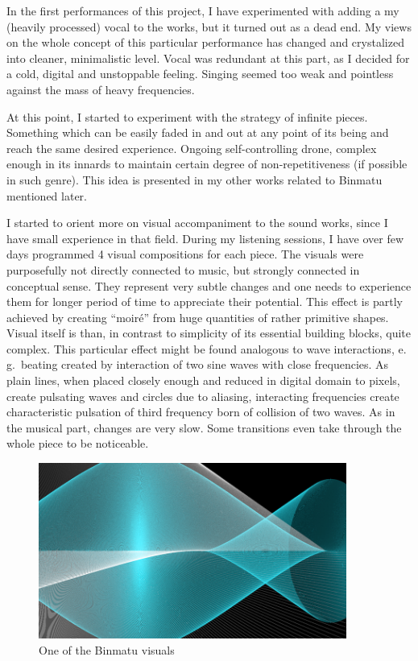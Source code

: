 \documentclass[12pt,a4paper,oneside]{report}
\begin{document}
In the first performances of this project, I have experimented with adding a my (heavily processed) vocal to the works, but it turned out as a dead end. My views on the whole concept of this particular performance has changed and crystalized into cleaner, minimalistic level. Vocal was redundant at this part, as I decided for a cold, digital and unstoppable feeling. Singing seemed too weak and pointless against the mass of heavy frequencies. 

At this point, I started to experiment with the strategy of infinite pieces. Something which can be easily faded in and out at any point of its being and reach the same desired experience. Ongoing self-controlling drone, complex enough in its innards to maintain certain degree of non-repetitiveness (if possible in such genre). This idea is presented in my other works related to Binmatu mentioned later. 

I started to orient more on visual accompaniment to the sound works, since I have small experience in that field. During my listening sessions, I have over few days programmed 4 visual compositions for each piece. The visuals were purposefully not directly connected to music, but strongly connected in conceptual sense. They represent very subtle changes and one needs to experience them for longer period of time to appreciate their potential. This effect is partly achieved by creating ``moiré'' from huge quantities of rather primitive shapes. Visual itself is than, in contrast to simplicity of its essential building blocks, quite complex. This particular effect might be found analogous to wave interactions, e. g.\ beating created by interaction of two sine waves with close frequencies. As plain lines, when placed closely enough and reduced in digital domain to pixels, create pulsating waves and circles due to aliasing, interacting frequencies create characteristic pulsation of third frequency born of collision of two waves. As in the musical part, changes are very slow. Some transitions even take through the whole piece to be noticeable.

\begin{figure}  
  \centering
    \includegraphics[width=0.9\textwidth]{img/binmatu}
	\caption{One of the Binmatu visuals}
	\label{fig:binmatu}
\end{figure}
\end{document}

